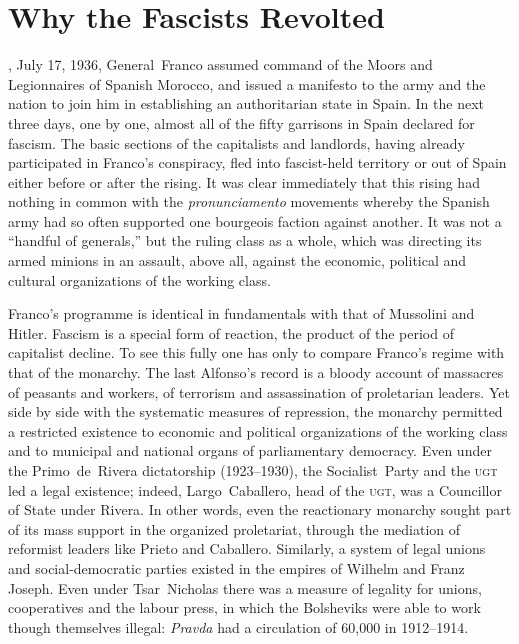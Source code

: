 \chapter{Why the Fascists Revolted}

, July 17, 1936, General~Franco{\indexFFranco} assumed command of the Moors and Legionnaires of Spanish Morocco, and issued a manifesto to the army and the nation to join him in establishing an authoritarian state in Spain. In the next three days, one by one, almost all of the fifty garrisons in Spain declared for fascism. The basic sections of the capitalists and landlords, having already participated in Franco’s conspiracy, fled into fascist-held territory or out of Spain either before or after the rising. It was clear immediately that this rising had nothing in common with the \emph{pronunciamento} movements whereby the Spanish army had so often supported one bourgeois faction against another. It was not a ``handful of generals,'' but the ruling class as a whole, which was directing its armed minions in an assault, above all, against the economic, political and cultural organizations of the working class.

Franco’s programme is identical in fundamentals with that of Mussolini and Hitler. Fascism is a special form of reaction, the product of the period of capitalist decline. To see this fully one has only to compare Franco’s regime with that of the monarchy. The last Alfonso’s record is a bloody account of massacres of peasants and workers, of terrorism and assassination of proletarian leaders. Yet side by side with the systematic measures of repression, the monarchy permitted a restricted existence to economic and political organizations of the working class and to municipal and national organs of parliamentary democracy. Even under the Primo~de~Rivera dictatorship (1923--1930), the Socialist~Party and the \textsc{ugt} led a legal existence; indeed, Largo~Caballero{\indexLCaballero}, head of the \textsc{ugt}, was a Councillor of State under Rivera. In other words, even the reactionary monarchy sought part of its mass support in the organized proletariat, through the mediation of reformist leaders like Prieto and Caballero. Similarly, a system of legal unions and social-democratic parties existed in the empires of Wilhelm and Franz Joseph. Even under Tsar~Nicholas there was a measure of legality for unions, cooperatives and the labour press, in which the Bolsheviks were able to work though themselves illegal: \emph{Pravda} had a circulation of 60,000 in 1912--1914.

